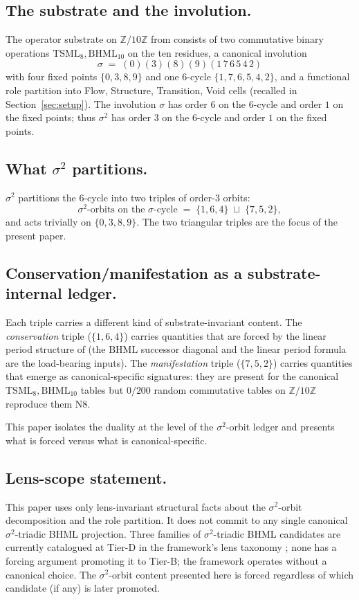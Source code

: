 \documentclass[11pt,reqno]{amsart}
\theoremstyle{plain}
\theoremstyle{definition}
\theoremstyle{remark}
\newcommand{\Z}{\mathbb{Z}}
\newcommand{\TS}{\mathrm{TSML}}
\newcommand{\BH}{\mathrm{BHML}}
\newcommand{\sig}{\sigma}
\begin{document}
\subsection{The substrate and the involution.}
The operator substrate on $\Z/10\Z$ from \cite{SandersGishFourCore}
consists of two commutative binary operations $\TS_{8}, \BH_{10}$ on
the ten residues, a canonical involution
\[
  \sig \;=\; (0)(3)(8)(9)(1\,7\,6\,5\,4\,2)
\]
with four fixed points $\{0, 3, 8, 9\}$ and one $6$-cycle
$\{1, 7, 6, 5, 4, 2\}$, and a functional role partition into Flow,
Structure, Transition, Void cells (recalled in
Section~\ref{sec:setup}). The involution $\sig$ has order $6$ on the
$6$-cycle and order $1$ on the fixed points; thus $\sig^{2}$ has order
$3$ on the $6$-cycle and order $1$ on the fixed points.

\subsection{What $\sig^{2}$ partitions.}
$\sig^{2}$ partitions the $6$-cycle into two triples of order-$3$
orbits:
\[
  \sig^{2}\text{-orbits on the }\sig\text{-cycle}
  \;=\; \{1, 6, 4\} \;\sqcup\; \{7, 5, 2\},
\]
and acts trivially on $\{0, 3, 8, 9\}$. The two triangular triples are
the focus of the present paper.

\subsection{Conservation/manifestation as a substrate-internal
ledger.}
Each triple carries a different kind of substrate-invariant content.
The \emph{conservation} triple ($\{1, 6, 4\}$) carries quantities that
are forced by the linear period structure of \cite{SandersBridgeWP9}
(the $\BH$ successor diagonal and the linear period formula are the
load-bearing inputs). The \emph{manifestation} triple ($\{7, 5, 2\}$)
carries quantities that emerge as canonical-specific signatures: they
are present for the canonical $\TS_{8}, \BH_{10}$ tables but
$0/200$ random commutative tables on $\Z/10\Z$ reproduce them
\cite{SandersBridgeWP9} N8.

This paper isolates the duality at the level of the $\sig^{2}$-orbit
ledger and presents what is forced versus what is canonical-specific.

\subsection{Lens-scope statement.}
This paper uses only lens-invariant structural facts about the
$\sig^{2}$-orbit decomposition and the role partition. It does not
commit to any single canonical $\sig^{2}$-triadic BHML projection.
Three families of $\sig^{2}$-triadic BHML candidates are currently
catalogued at Tier-D in the framework's lens taxonomy
\cite{Atlas2026Tiering}; none has a forcing argument promoting it to
Tier-B; the framework operates without a canonical choice. The
$\sig^{2}$-orbit content presented here is forced regardless of which
candidate (if any) is later promoted.
\end{document}

